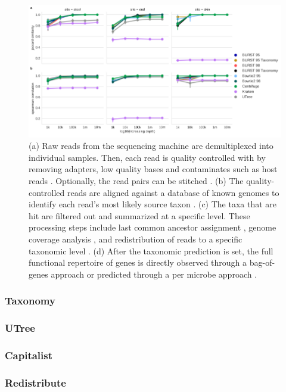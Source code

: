 \documentclass[conference,11pt]{IEEEtran}
\begin{document}
\begin{figure}[hbt]
    \centering
    \includegraphics[width=0.8\linewidth]{fig/simulations_js.png}
    \caption{(a) Raw reads from the sequencing machine are demultiplexed into individual samples. Then, each read is quality controlled with by removing adapters, low quality bases and contaminates such as host reads \cite{consortium_structure_2012}. Optionally, the read pairs can be stitched \cite{magoc_flash:_2011}. (b) The quality-controlled reads are aligned against a database of known genomes to identify each read's most likely source taxon \cite{langmead_fast_2012}. (c) The taxa that are hit are filtered out and summarized at a specific level. These processing steps include last common ancestor assignment \cite{hong_pathoscope_2014}, genome coverage analysis \cite{wood_kraken:_2014}, and redistribution of reads to a specific taxonomic level \cite{lu_bracken:_2017}. (d) After the taxonomic prediction is set, the full functional repertoire of genes is directly observed through a bag-of-genes approach or predicted through a per microbe approach \cite{langille_predictive_2013}.}
      \label{fig:simulations_js}
\end{figure}

\subsubsection{Taxonomy} 

\subsubsection{UTree}

\subsubsection{Capitalist}

\subsubsection{Redistribute}
\end{document}
